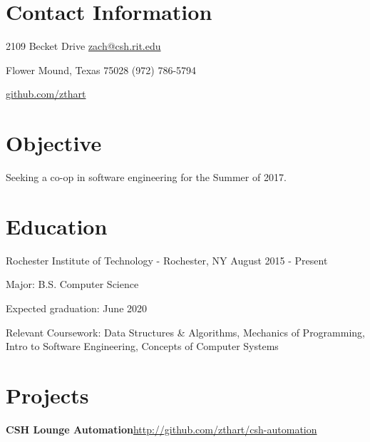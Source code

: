 \documentclass[margin,line]{resume}
\newcommand{\rurl}[1]{\hfill {\footnotesize \url{#1}}}
\newcommand{\rdate}[1]{\hfill {\small #1}}
\begin{document}
\begin{resume}
\section{\mysidestyle Contact Information} 
	\begin{asparablank}
		\item 2109 Becket Drive  \hfill \href{mailto:zach@csh.rit.edu}{zach@csh.rit.edu}
		\item Flower Mound, Texas 75028 \hfill (972) 786-5794
		\item \hfill \rurl{github.com/zthart}
    \end{asparablank}

\section{\mysidestyle Objective}
	\begin{asparablank}
    	\item Seeking a co-op in software engineering for the Summer of 2017.
        \normalsize
        \\
	\end{asparablank}

\section{\mysidestyle Education}
	\begin{compactdesc}
		\item[Rochester Institute of Technology] - Rochester, NY \rdate{August 2015 - Present}
		\begin{compactitem} { \small
			\item Major: B.S. Computer Science
			\item Expected graduation: June 2020
            \item Relevant Coursework: Data Structures \& Algorithms, Mechanics of Programming, Intro to Software Engineering, Concepts of Computer Systems
		} \end{compactitem}
	\end{compactdesc}


\section{\mysidestyle Projects}
	\begin{asparablank}
		\item {\bf CSH Lounge Automation}\rurl{http://github.com/zthart/csh-automation}


\end{asparablank}
\end{resume}
\end{document}

